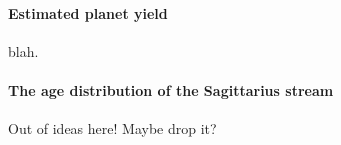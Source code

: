 \documentclass[letterpaper,12pt,preprint]{hack_aastex}
\begin{document}
\paragraph{Estimated planet yield} blah.

\paragraph{The age distribution of the Sagittarius stream}

Out of ideas here! Maybe drop it?


\end{document}
